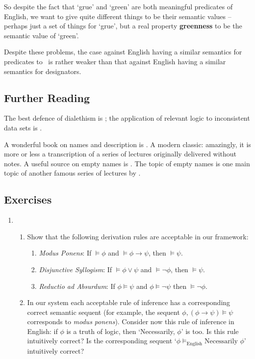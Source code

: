 So despite the fact that `grue' and `green' are both meaningful predicates of English, we want to give quite different things to be their semantic values – perhaps just a set of things for `grue', but a real property \textbf{greenness} to be the semantic value of `green'.

Despite these problems, the case against English having a similar semantics for predicates to \ltwo\ is rather weaker than that against English having a similar semantics for designators.


{\small
\subsection*{Further Reading}




 The best defence of dialethism is \citet{priinco}; the application of relevant logic to inconsistent data sets is \citet{belusefov}.  

A wonderful book on names and description is \citet{krinamne}. A modern classic: amazingly, it is more or less a transcription of a series of lectures originally delivered without notes. A useful source on empty names is \citet{capempna}. The topic of empty names is one main topic of another famous series of lectures by \citet{krirefex}.



\subsection*{Exercises}


\begin{enumerate}
	
	\item 	\begin{enumerate} \item Show that the following derivation rules are acceptable in our framework: \begin{enumerate}
		\item \emph{Modus Ponens}: If $\vDash \phi$ and $\vDash \phi \to \psi$, then $\vDash \psi$.
				\item \emph{Disjunctive Syllogism}: If $\vDash \phi \vee \psi$ and $\vDash \neg \phi$, then $\vDash \psi$.
				\item \emph{Reductio ad Absurdum}: If $\phi \vDash \psi$ and $\phi \vDash \neg \psi$ then $\vDash \neg \phi$. \end{enumerate}
	\item
		 In our system each acceptable rule of inference has a corresponding correct semantic sequent (for example, the sequent $\phi, (\phi \to \psi) \vDash \psi$ corresponds to  \emph{modus ponens}). Consider now this rule of inference in English: if $\phi$ is a truth of logic, then `Necessarily, $\phi$' is too.  Is this rule intuitively correct? Is the corresponding sequent `$\phi \vDash_{\text{English}} \text{Necessarily } \phi$' intuitively correct?
		\end{enumerate}



\end{enumerate}}
